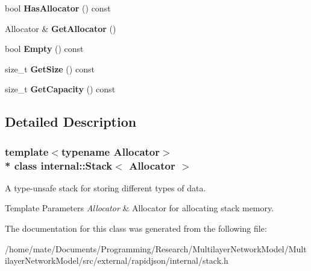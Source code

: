\begin{DoxyCompactItemize}
\item 
bool {\bfseries Has\+Allocator} () const \hypertarget{classinternal_1_1Stack_a6cd7033d53a1da185ea6dc2e15f7234c}{}\label{classinternal_1_1Stack_a6cd7033d53a1da185ea6dc2e15f7234c}

\item 
Allocator \& {\bfseries Get\+Allocator} ()\hypertarget{classinternal_1_1Stack_ab01f693833dfe136f574d66547623cfa}{}\label{classinternal_1_1Stack_ab01f693833dfe136f574d66547623cfa}

\item 
bool {\bfseries Empty} () const \hypertarget{classinternal_1_1Stack_abf57d1c7b356d8acbbe0e79147ca4b5c}{}\label{classinternal_1_1Stack_abf57d1c7b356d8acbbe0e79147ca4b5c}

\item 
size\+\_\+t {\bfseries Get\+Size} () const \hypertarget{classinternal_1_1Stack_ade4a25fa82950619652a30aa3a807f58}{}\label{classinternal_1_1Stack_ade4a25fa82950619652a30aa3a807f58}

\item 
size\+\_\+t {\bfseries Get\+Capacity} () const \hypertarget{classinternal_1_1Stack_a61dea1ed780c07bb438d17c581ab0e48}{}\label{classinternal_1_1Stack_a61dea1ed780c07bb438d17c581ab0e48}

\end{DoxyCompactItemize}


\subsection{Detailed Description}
\subsubsection*{template$<$typename Allocator$>$\\*
class internal\+::\+Stack$<$ Allocator $>$}

A type-\/unsafe stack for storing different types of data. 


\begin{DoxyTemplParams}{Template Parameters}
{\em Allocator} & Allocator for allocating stack memory. \\
\hline
\end{DoxyTemplParams}


The documentation for this class was generated from the following file\+:\begin{DoxyCompactItemize}
\item 
/home/mate/\+Documents/\+Programming/\+Research/\+Multilayer\+Network\+Model/\+Multilayer\+Network\+Model/src/external/rapidjson/internal/stack.\+h\end{DoxyCompactItemize}
